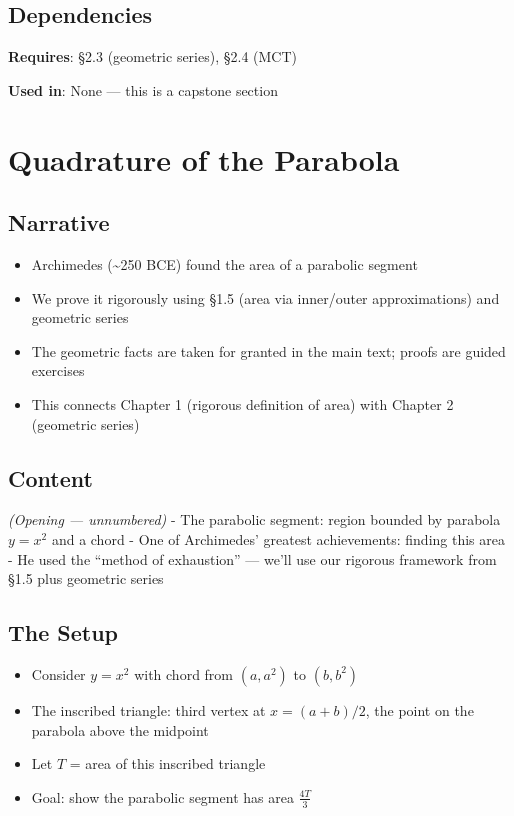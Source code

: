 \documentclass[
  10pt,
  letterpaper,
]{scrbook}
\providecommand{\tightlist}{%
  \setlength{\itemsep}{0pt}\setlength{\parskip}{0pt}}
\begin{document}
\subsection{Dependencies}\label{dependencies-9}

\textbf{Requires}: §2.3 (geometric series), §2.4 (MCT)

\textbf{Used in}: None --- this is a capstone section

\section{Quadrature of the Parabola}\label{quadrature-of-the-parabola}

\subsection{Narrative}\label{narrative-10}

\begin{itemize}
\tightlist
\item
  Archimedes (\textasciitilde250 BCE) found the area of a parabolic
  segment
\item
  We prove it rigorously using §1.5 (area via inner/outer
  approximations) and geometric series
\item
  The geometric facts are taken for granted in the main text; proofs are
  guided exercises
\item
  This connects Chapter 1 (rigorous definition of area) with Chapter 2
  (geometric series)
\end{itemize}

\subsection{Content}\label{content-10}

\emph{(Opening --- unnumbered)} - The parabolic segment: region bounded
by parabola \(y = x^2\) and a chord - One of Archimedes' greatest
achievements: finding this area - He used the ``method of exhaustion''
--- we'll use our rigorous framework from §1.5 plus geometric series

\subsection{The Setup}\label{the-setup}

\begin{itemize}
\tightlist
\item
  Consider \(y = x^2\) with chord from \((a, a^2)\) to \((b, b^2)\)
\item
  The inscribed triangle: third vertex at \(x = (a+b)/2\), the point on
  the parabola above the midpoint
\item
  Let \(T\) = area of this inscribed triangle
\item
  Goal: show the parabolic segment has area \(\frac{4T}{3}\)
\end{itemize}
\end{document}
